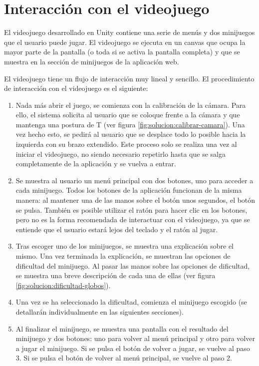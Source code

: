 
\section{Interacción con el videojuego}
\label{sec:interaccion-videojuego}
El videojuego desarrollado en Unity contiene una serie de menús y dos minijuegos que el usuario
puede jugar. El videojuego se ejecuta en un canvas que ocupa la mayor parte de la pantalla (o toda
si se activa la pantalla completa) y que se muestra en la sección de minijuegos de la aplicación
web.

El videojuego tiene un flujo de interacción muy lineal y sencillo. El procedimiento de interacción
con el videojuego es el siguiente:
\begin{enumerate}
    \item Nada más abrir el juego, se comienza con la calibración de la cámara. Para ello,
        el sistema solicita al usuario que se coloque frente a la cámara y que mantenga una postura
        de T (ver figura \ref{fig:solucion:calibrar-camara}). Una vez hecho esto, se pedirá al
        usuario que se desplace todo lo posible hacia la izquierda con su brazo extendido. Este
        proceso solo se realiza una vez al iniciar el videojuego, no siendo necesario repetirlo
        hasta que se salga completamente de la aplicación y se vuelva a entrar.

    \item Se muestra al usuario un menú principal con dos botones, uno para acceder a cada
        minijuego. Todos los botones de la aplicación funcionan de la misma manera: al mantener una
        de las manos sobre el botón unos segundos, el botón se pulsa. También es posible utilizar
        el ratón para hacer clic en los botones, pero no es la forma recomendada de interactuar
        con el videojuego, ya que se entiende que el usuario estará lejos del teclado y el ratón
        al jugar.

    \item Tras escoger uno de los minijuegos, se muestra una explicación sobre el mismo. Una vez
        terminada la explicación, se muestran las opciones de dificultad del minijuego. Al pasar
        las manos sobre las opciones de dificultad, se muestra una breve descripción de cada una
        de ellas (ver figura \ref{fig:solucion:dificultad-globos}).

    \item Una vez se ha seleccionado la dificultad, comienza el minijuego escogido (se detallarán
        individualmente en las siguientes secciones).

    \item Al finalizar el minijuego, se muestra una pantalla con el resultado del minijuego y dos
        botones: uno para volver al menú principal y otro para volver a jugar el minijuego. Si se
        pulsa el botón de volver a jugar, se vuelve al paso 3. Si se pulsa el botón de volver al
        menú principal, se vuelve al paso 2.
\end{enumerate}

